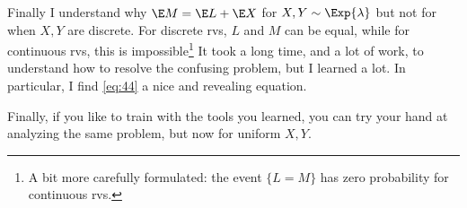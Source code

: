 \documentclass[a4paper]{article}
\begin{document}
Finally I understand why  \(\E M = \E L + \E X\) for \(X,Y\sim \Exp{\lambda}\) but not for when \(X, Y\) are discrete. For discrete rvs, \(L\) and \(M\) can be equal, while for continuous rvs, this is impossible\footnote{A bit more carefully formulated: the event \(\{L=M\}\) has zero probability for continuous rvs.} It took a long time, and a lot of work, to understand how to resolve the confusing problem, but I learned a lot.
In particular, I find \cref{eq:44} a nice and revealing equation.

Finally, if you like to train with the  tools you learned,  you can try your hand at analyzing the same problem, but now for uniform \(X, Y\).
\end{document}
